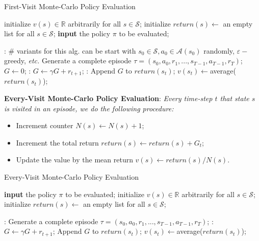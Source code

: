 \documentclass{progartcn}
\begin{document}
		\begin{algorithm}[h]
		\caption{First-Visit Monte-Carlo Policy Evaluation}
		\label{alg: First-Visit Monte-Carlo Policy Evaluation}
		\begin{algorithmic}[1]
			\State initialize $v(s)\in\mathbb{R}$ arbitrarily for all $s\in\mathcal{S}$; 
            \State initialize $return(s)\gets$ an empty list for all $s\in\mathcal{S}$;
            \State \textbf{input} the policy $\pi$ to be evaluated; 
            
            :
            	\Statex \# variants for this alg. can be start with $s_0\in\mathcal{S},a_0\in\mathcal{A}(s_0)$ randomly, $\varepsilon-$greedy, \textit{etc.}
            	\State Generate a complete episode $\tau=(s_0,a_0,r_1,...,s_{T-1},a_{T-1},r_{T})$;
            	\State $G\gets0$;
            	:
            		\State $G\gets\gamma G+r_{t+1}$;
            		:
            			\State Append $G$ to $return(s_t)$;
            			\State $v(s_t)\gets$average($return(s_t)$);
            		\EndIf
            	\EndFor
            \EndFor
        \end{algorithmic}
        \end{algorithm}

		\textbf{Every-Visit Monte-Carlo Policy Evaluation}: \textit{Every time-step $t$ that state $s$ is visited in an episode, we do the following procedure:}
		\begin{itemize}[noitemsep,topsep=0pt]
			\item Increment counter $N(s)\gets N(s)+1$;
			\item Increment the total return $return(s)\gets return(s)+G_t$;
			\item Update the value by the mean return $v(s)\gets return(s)/N(s)$.\\
		\end{itemize}

		\begin{algorithm}[H]
		\caption{Every-Visit Monte-Carlo Policy Evaluation}
		\label{alg: Every-Visit Monte-Carlo Policy Evaluation}
		\begin{algorithmic}[1]
  			\State \textbf{input} the policy $\pi$ to be evaluated;
  			\State initialize $v(s)\in\mathbb{R}$ arbitrarily for all $s\in\mathcal{S}$;
			\State initialize $return(s)\gets$ an empty list for all $s\in\mathcal{S}$;
            
            :
            	\State Generate a complete episode $\tau=(s_0,a_0,r_1,...,s_{T-1},a_{T-1},r_{T})$;
            	:
            		\State $G\gets\gamma G+r_{t+1}$;
            		\State Append $G$ to $return(s_t)$;
            		\State $v(s_t)\gets$average($return(s_t)$);
            	\EndFor
            \EndFor
        \end{algorithmic}
        \end{algorithm}
\end{document}
